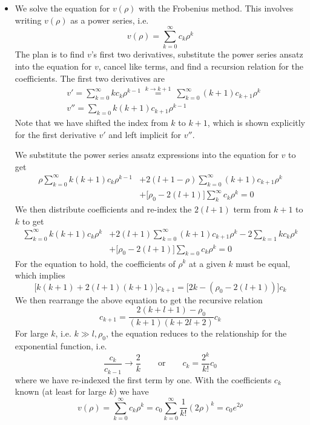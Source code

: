 \documentclass[11pt, a4paper]{article}
\newcommand{\eqtext}[1]{\qquad \text{#1} \qquad}
\begin{document}
\begin{itemize}
	\item We solve the equation for $ v(\rho) $ with the Frobenius method. This involves writing $ v(\rho) $ as a power series, i.e.
	\begin{equation*}
		v(\rho) = \sum_{k = 0}^{\infty} c_{k}\rho^{k}
	\end{equation*}
	The plan is to find $ v $'s first two derivatives, substitute the power series ansatz into the equation for $ v $, cancel like terms, and find a recursion relation for the coefficients. The first two derivatives are
	\begin{align*}
		& v' = \sum_{k = 0}^{\infty}kc_{k}\rho^{k-1} \ \stackrel{k\to k+1}{=} \ \sum_{k=0}^{\infty}(k+1)c_{k+1}\rho^{k}\\
		&v'' = \sum_{k = 0} k(k+1)c_{k+1}\rho^{k-1}
	\end{align*}
	Note that we have shifted the index from $ k $ to $ k + 1 $, which is shown explicitly for the first derivative $ v' $ and left implicit for $ v'' $.
	
	We substitute the power series ansatz expressions into the equation for $ v $ to get
	\begin{align*}
		\rho\sum_{k = 0}^{\infty}k(k+1)c_{k}\rho^{k-1}  &+ 2(l+1-\rho)\sum_{k=0}^{\infty}(k+1)c_{k+1}\rho^{k} \\
		& + \big[\rho_{0} - 2(l+1)\big]\sum_{k}^{\infty} c_{k}\rho^{k} = 0
	\end{align*}
	We then distribute coefficients and re-index the $ 2(l+1) $ term from $ k + 1 $ to $ k $ to get
	\begin{align*}
		\sum_{k = 0}^{\infty}k(k+1)c_{k}\rho^{k}  &+ 2(l+1)\sum_{k=0}^{\infty}(k+1)c_{k+1}\rho^{k} - 2 \sum_{k=1}kc_{k}\rho^{k} \\
		& + \big[\rho_{0} - 2(l+1)\big]\sum_{k=0}c_{k}\rho^{k} = 0
	\end{align*}
	For the equation to hold, the coefficients of $ \rho^{k} $ at a given $ k $ must be equal, which implies 
	\begin{equation*}
		\big[k(k+1) + 2(l+1)(k+1)\big]c_{k+1} = \big[2k - (\rho_{0} - 2(l+1))\big]c_{k}
	\end{equation*}
	We then rearrange the above equation to get the recursive relation
	\begin{equation*}
		c_{k+1} = \frac{2(k+l+1)-\rho_{0}}{(k+1)(k+2l + 2)}c_{k}
	\end{equation*}
	For large $ k $, i.e. $ k \gg l, \rho_{0} $, the equation reduces to the relationship for the exponential function, i.e.
	\begin{equation*}
		\frac{c_{k}}{c_{k-1}} \to \frac{2}{k} \eqtext{or} c_{k} = \frac{2^{k}}{k!}c_{0}
	\end{equation*}
	where we have re-indexed the first term by one. With the coefficients $ c_{k} $ known (at least for large $ k $) we have
	\begin{equation*}
		v(\rho) = \sum_{k = 0}^{\infty}c_{k}\rho^{k} = c_{0}\sum_{k = 0}^{\infty} \frac{1}{k!}(2\rho)^{k} = c_{0}e^{2\rho}
	\end{equation*}
	

\end{itemize}
\end{document}
